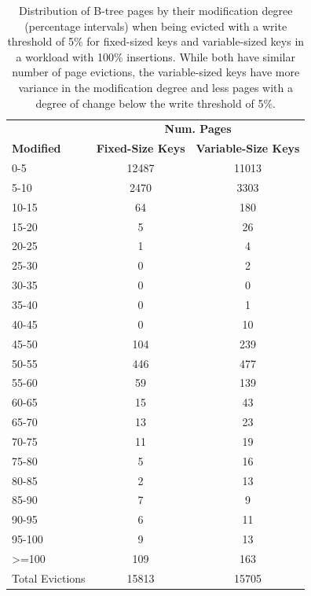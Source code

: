 \begin{table}[ht]
\centering
\begin{tabular}{l|cc}
   \toprule
    & \multicolumn{2}{c}{\textbf{Num. Pages}} \\
    \cmidrule(lr){2-3}
    \textbf{Modified} & \textbf{Fixed-Size Keys} & \textbf{Variable-Size Keys} \\
    \midrule
    0-5     & 12487 & 11013 \\
    5-10    & 2470  & 3303  \\
    10-15   & 64    & 180   \\
    15-20   & 5     & 26    \\
    20-25   & 1     & 4     \\
    25-30   & 0     & 2     \\
    30-35   & 0     & 0     \\
    35-40   & 0     & 1     \\
    40-45   & 0     & 10    \\
    45-50   & 104   & 239   \\
    50-55   & 446   & 477   \\
    55-60   & 59    & 139   \\
    60-65   & 15    & 43    \\
    65-70   & 13    & 23    \\
    70-75   & 11    & 19    \\
    75-80   & 5     & 16    \\
    80-85   & 2     & 13    \\
    85-90   & 7     & 9     \\
    90-95   & 6     & 11    \\
    95-100  & 9     & 13    \\
    >=100   & 109   & 163   \\
    \midrule
    Total Evictions & 15813 & 15705 \\
\bottomrule
\end{tabular}
\caption{Distribution of B-tree pages by their modification degree (percentage intervals) when being evicted with a write threshold of 5\% for fixed-sized keys and variable-sized keys in a workload with 100\% insertions. While both have similar number of page evictions, the variable-sized keys have more variance in the modification degree and less pages with a degree of change below the write threshold of 5\%.}
\label{tab:modification-degree-variable-size}
\end{table}


